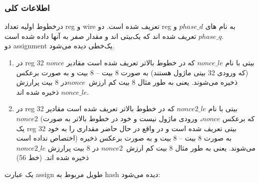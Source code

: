 \subsubsection{اطلاعات کلی}
درخطوط اولیه تعداد reg و wire تعریف شده است.
دو reg به نام های $ phase\_d$ و $phase\_q $ تعریف شده اند که یک‌بیتی اند و مقدار صفر به آنها داده شده است.\\
دو assignment یک‌خطی دیده می‌شود.

\begin{enumerate}
	\item در reg 32 بیتی با نام $nonce\_le$ که در خطوط بالاتر تعریف شده است مقادیر $nonce$ (که ورودی 32 بیتی ماژول هستند) به صورت 8 بیت – 8 بیت و به صورت برعکس ذخیره می‌شوند. یعنی به طور مثال 8 بیت کم ارزش\  $nonce$در 8 بیت پرارزش $nonce\_le$ ذخیره شده اند.
	      
	\item در reg 32 بیتی با نام $nonce2\_le$ که در خطوط بالاتر تعریف شده است مقادیر $nonce2$ (که برعکس $nonce$، ورودی ماژول نیست و خود در خطوط بالاتر به صورت یک reg 32 بیتی تعریف شده است و در واقع در حال حاضر مقداری را به خود اختصاص نداده است) به صورت 8 بیت – 8 بیت و به صورت برعکس ذخیره می‌شوند. یعنی به طور مثال 8 بیت کم ارزش\  $nonce2$ در 8 بیت پرارزش  $nonce2\_le$ ذخیره شده اند. (خط 56)
\end{enumerate}

یک عبارت assign طویل مربوط به hash دیده می‌شود:

